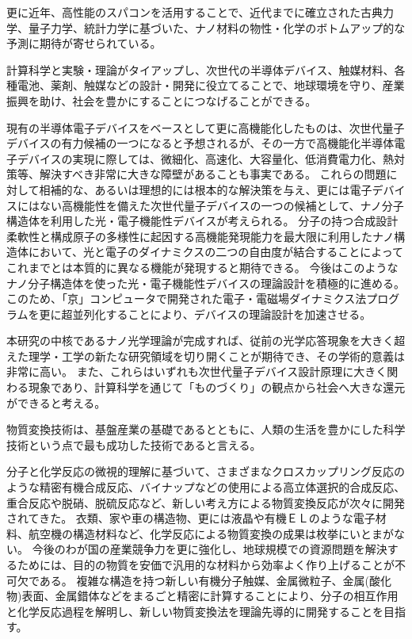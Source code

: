更に近年、高性能のスパコンを活用することで、近代までに確立された古典力学、量子力学、統計力学に基づいた、ナノ材料の物性・化学のボトムアップ的な予測に期待が寄せられている。

計算科学と実験・理論がタイアップし、次世代の半導体デバイス、触媒材料、各種電池、薬剤、触媒などの設計・開発に役立てることで、地球環境を守り、産業振興を助け、社会を豊かにすることにつなげることができる。

現有の半導体電子デバイスをベースとして更に高機能化したものは、次世代量子デバイスの有力候補の一つになると予想されるが、その一方で高機能化半導体電子デバイスの実現に際しては、微細化、高速化、大容量化、低消費電力化、熱対策等、解決すべき非常に大きな障壁があることも事実である。
これらの問題に対して相補的な、あるいは理想的には根本的な解決策を与え、更には電子デバイスにはない高機能性を備えた次世代量子デバイスの一つの候補として、ナノ分子構造体を利用した光・電子機能性デバイスが考えられる。
分子の持つ合成設計柔軟性と構成原子の多様性に起因する高機能発現能力を最大限に利用したナノ構造体において、光と電子のダイナミクスの二つの自由度が結合することによってこれまでとは本質的に異なる機能が発現すると期待できる。
今後はこのようなナノ分子構造体を使った光・電子機能性デバイスの理論設計を積極的に進める。
このため、「京」コンピュータで開発された電子・電磁場ダイナミクス法プログラムを更に超並列化することにより、デバイスの理論設計を加速させる。

本研究の中核であるナノ光学理論が完成すれば、従前の光学応答現象を大きく超えた理学・工学の新たな研究領域を切り開くことが期待でき、その学術的意義は非常に高い。
また、これらはいずれも次世代量子デバイス設計原理に大きく関わる現象であり、計算科学を通じて「ものづくり」の観点から社会へ大きな還元ができると考える。

物質変換技術は、基盤産業の基礎であるとともに、人類の生活を豊かにした科学技術という点で最も成功した技術であると言える。

分子と化学反応の微視的理解に基づいて、さまざまなクロスカップリング反応のような精密有機合成反応、バイナップなどの使用による高立体選択的合成反応、重合反応や脱硝、脱硫反応など、新しい考え方による物質変換反応が次々に開発されてきた。
衣類、家や車の構造物、更には液晶や有機ＥＬのような電子材料、航空機の構造材料など、化学反応による物質変換の成果は枚挙にいとまがない。
今後のわが国の産業競争力を更に強化し、地球規模での資源問題を解決するためには、目的の物質を安価で汎用的な材料から効率よく作り上げることが不可欠である。
複雑な構造を持つ新しい有機分子触媒、金属微粒子、金属(酸化物)表面、金属錯体などをまるごと精密に計算することにより、分子の相互作用と化学反応過程を解明し、新しい物質変換法を理論先導的に開発することを目指す。

